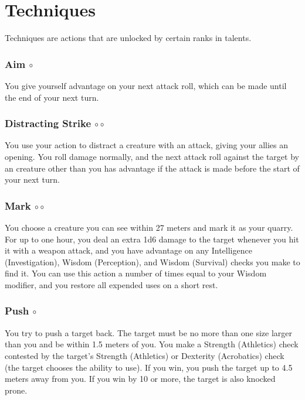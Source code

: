 \section{Techniques} %
Techniques are actions that are unlocked by certain ranks in talents. %


\subsubsection{Aim $\circ$} \label{act::aim}
    You give yourself advantage on your next attack roll, which can be made until the end of your next turn.

\subsubsection{Distracting Strike $\circ\circ$} \label{act::distractingstrike}
    You use your action to distract a creature with an attack, giving your allies an opening.
    You roll damage normally, and the next attack roll against the target by an creature other than you has advantage if the attack is made before the start of your next turn.

\subsubsection{Mark $\circ\circ$} \label{act::mark}
    You choose a creature you can see within 27 meters and mark it as your quarry.
    For up to one hour, you deal an extra 1d6 damage to the target whenever you hit it with a weapon attack, and you have advantage on any Intelligence (Investigation), Wisdom (Perception), and Wisdom (Survival) checks you make to find it.
    You can use this action a number of times equal to your Wisdom modifier, and you restore all expended uses on a short rest.

\subsubsection{Push $\circ$} \label{act::push}
    You try to push a target back.
    The target must be no more than one size larger than you and be within 1.5 meters of you.
    You make a Strength (Athletics) check contested by the target's Strength (Athletics) or Dexterity (Acrobatics) check (the target chooses the ability to use).
    If you win, you push the target up to 4.5 meters away from you.
    If you win by 10 or more, the target is also knocked prone.

